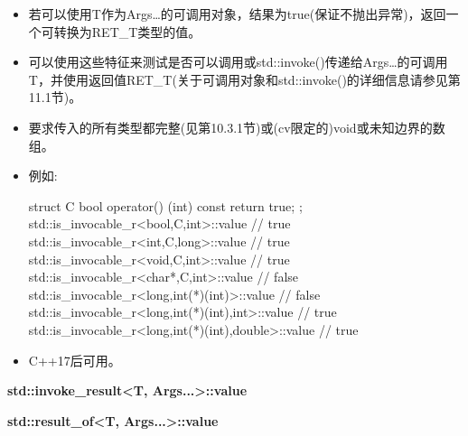 \begin{itemize}
\item 
若可以使用T作为Args…的可调用对象，结果为true(保证不抛出异常)，返回一个可转换为RET\_T类型的值。

\item 
可以使用这些特征来测试是否可以调用或std::invoke()传递给Args…的可调用T，并使用返回值RET\_T(关于可调用对象和std::invoke()的详细信息请参见第11.1节)。

\item 
要求传入的所有类型都完整(见第10.3.1节)或(cv限定的)void或未知边界的数组。

\item 
例如:
\begin{cpp}
struct C {
	bool operator() (int) const {
		return true;
	}
};
std::is_invocable_r<bool,C,int>::value // true
std::is_invocable_r<int,C,long>::value // true
std::is_invocable_r<void,C,int>::value // true
std::is_invocable_r<char*,C,int>::value // false
std::is_invocable_r<long,int(*)(int)>::value // false
std::is_invocable_r<long,int(*)(int),int>::value // true
std::is_invocable_r<long,int(*)(int),double>::value // true
\end{cpp}

\item 
C++17后可用。
\end{itemize}

\textbf{std::invoke\_result<T, Args...>::value}

\textbf{std::result\_of<T, Args...>::value}

